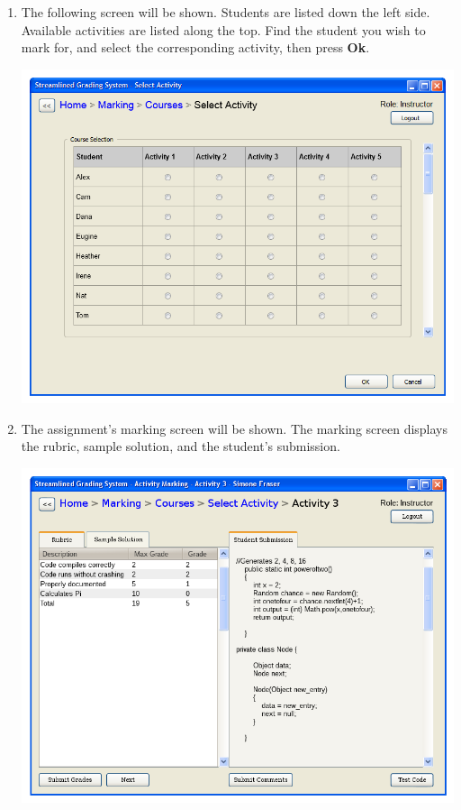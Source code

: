 \documentclass{article}
\begin{document}
\begin{enumerate}
\begin{center}
    \end{center}
  \item The following screen will be shown.  Students are listed down the left
    side. Available activities are listed along the top.  Find the student you
    wish to mark for, and select the corresponding activity, then press \textbf{Ok}.
  \begin{center} 
    \includegraphics[scale=0.55]{../images/UIMockups/pngs/StudentActivitySelectionM}
  \end{center}
  \item The assignment's marking screen will be shown.  The marking screen
    displays the rubric, sample solution, and the student's submission.
  \begin{center} 
   \includegraphics[scale=0.55]{../images/UIMockups/pngs/activityMarking}

\end{center}
\end{enumerate}
\end{document}
